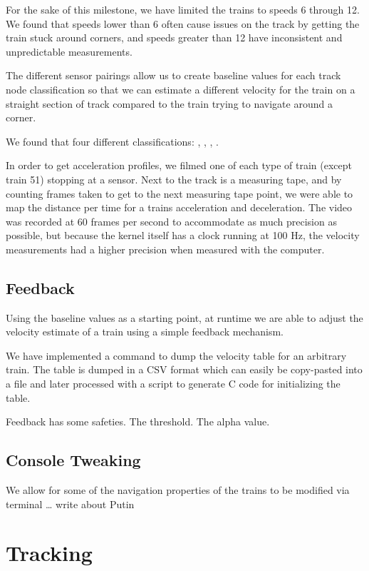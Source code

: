 \documentclass[pdftex,10pt,a4paper]{article}
\begin{document}
For the sake of this milestone, we have limited the trains to speeds 6
through 12. We found that speeds lower than 6 often cause issues on
the track by getting the train stuck around corners, and speeds
greater than 12 have inconsistent and unpredictable measurements.

The different sensor pairings allow us to create baseline values for
each track node classification so that we can estimate a different
velocity for the train on a straight section of track compared to the
train trying to navigate around a corner.

We found that four different classifications: ,
, , .

In order to get acceleration profiles, we filmed one of each type of
train (except train 51) stopping at a sensor. Next to the track is a
measuring tape, and by counting frames taken to get to the next
measuring tape point, we were able to map the distance per time for a
trains acceleration and deceleration. The video was recorded at 60
frames per second to accommodate as much precision as possible, but
because the kernel itself has a clock running at 100 Hz, the velocity
measurements had a higher precision when measured with the computer.

\subsection*{Feedback}

Using the baseline values as a starting point, at runtime we are able
to adjust the velocity estimate of a train using a simple feedback
mechanism.

We have implemented a  command to dump the velocity table for
an arbitrary train. The table is dumped in a CSV format which can
easily be copy-pasted into a file and later processed with a script to
generate C code for initializing the table.

Feedback has some safeties. The threshold. The alpha value.

\subsection*{Console Tweaking}

We allow for some of the navigation properties of the trains to be modified via
terminal \ldots
write about Putin

\section*{Tracking}
\end{document}

